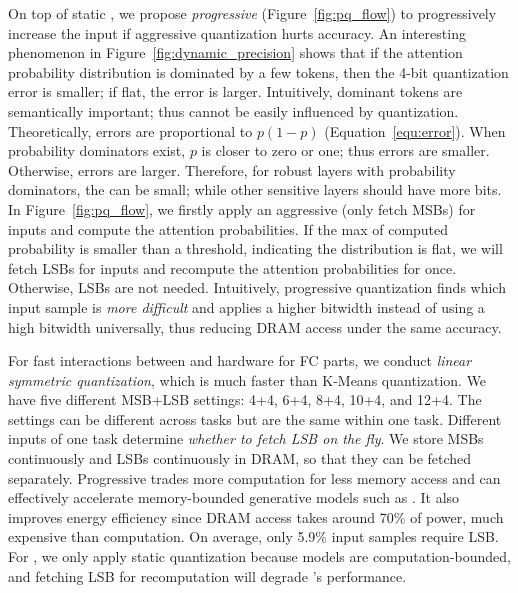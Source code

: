 

On top of static \lowprec, we propose \emph{progressive \lowprec} (Figure~\ref{fig:pq_flow}) to progressively increase the input \bitwidth if aggressive quantization hurts accuracy. An interesting phenomenon in Figure~\ref{fig:dynamic_precision} shows that if the attention probability distribution is dominated by a few tokens, then the 4-bit quantization error is smaller; if flat, the error is larger. Intuitively, dominant tokens are semantically important; thus cannot be easily influenced by quantization. Theoretically, errors are proportional to $p(1-p)$ (Equation~\ref{equ:error}). When probability dominators exist, $p$ is closer to zero or one; thus errors are smaller. Otherwise, errors are larger.
Therefore, for robust layers with probability dominators, the \bitwidth can be small; while other sensitive layers should have more bits. In Figure~\ref{fig:pq_flow}, we firstly apply an aggressive \bitwidth (only fetch MSBs) for inputs and compute the attention probabilities. If the max of computed probability is smaller than a threshold, indicating the distribution is flat, we will fetch LSBs for inputs and recompute the attention probabilities for once. Otherwise, LSBs are not needed. Intuitively, progressive quantization finds which input sample is \emph{more difficult} and applies a higher bitwidth instead of using a high bitwidth universally, thus reducing DRAM access under the same accuracy.

For fast interactions between \name and hardware for FC parts, we conduct \emph{linear symmetric quantization}, which is much faster than K-Means quantization. We have five different MSB+LSB settings: 4+4, 6+4, 8+4, 10+4, and 12+4. The settings can be different across tasks but are the same within one task. Different inputs of one task determine \emph{whether to fetch LSB on the fly}. We store MSBs continuously and LSBs continuously in DRAM, so that they can be fetched separately.
Progressive \lowprec trades more computation for less memory access and can effectively accelerate memory-bounded generative models such as \gpttwo. It also improves energy efficiency since DRAM access takes around 70\% of \name power, much expensive than computation.  
On average, only 5.9\% input samples require LSB. For \bert, we only apply static quantization because \bert models are computation-bounded, and fetching LSB for recomputation will degrade \bert's performance.
